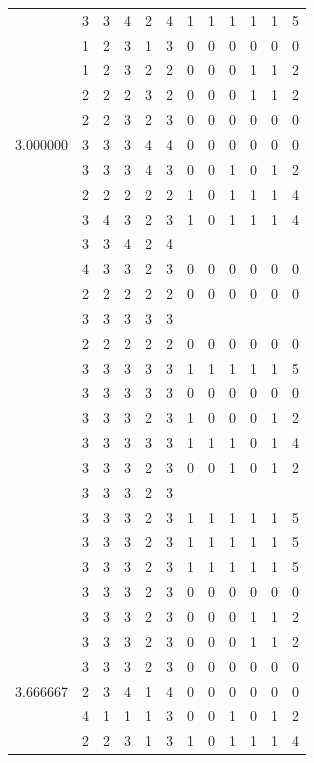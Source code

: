 \documentclass[]{book}
\theoremstyle{definition}
\theoremstyle{definition}
\theoremstyle{definition}
\theoremstyle{remark}
\begin{document}
\begin{table}
{\begin{tabular}[t]{rrrrrrrrrrrr}
 & 3 & 3 & 4 & 2 & 4 & 1 & 1 & 1 & 1 & 1 & 5\\
 & 1 & 2 & 3 & 1 & 3 & 0 & 0 & 0 & 0 & 0 & 0\\
 & 1 & 2 & 3 & 2 & 2 & 0 & 0 & 0 & 1 & 1 & 2\\
 & 2 & 2 & 2 & 3 & 2 & 0 & 0 & 0 & 1 & 1 & 2\\
 & 2 & 2 & 3 & 2 & 3 & 0 & 0 & 0 & 0 & 0 & 0\\
3.000000 & 3 & 3 & 3 & 4 & 4 & 0 & 0 & 0 & 0 & 0 & 0\\
 & 3 & 3 & 3 & 4 & 3 & 0 & 0 & 1 & 0 & 1 & 2\\
 & 2 & 2 & 2 & 2 & 2 & 1 & 0 & 1 & 1 & 1 & 4\\
 & 3 & 4 & 3 & 2 & 3 & 1 & 0 & 1 & 1 & 1 & 4\\
 & 3 & 3 & 4 & 2 & 4 &  &  &  &  &  & \\
 & 4 & 3 & 3 & 2 & 3 & 0 & 0 & 0 & 0 & 0 & 0\\
 & 2 & 2 & 2 & 2 & 2 & 0 & 0 & 0 & 0 & 0 & 0\\
 & 3 & 3 & 3 & 3 & 3 &  &  &  &  &  & \\
 & 2 & 2 & 2 & 2 & 2 & 0 & 0 & 0 & 0 & 0 & 0\\
 & 3 & 3 & 3 & 3 & 3 & 1 & 1 & 1 & 1 & 1 & 5\\
 & 3 & 3 & 3 & 3 & 3 & 0 & 0 & 0 & 0 & 0 & 0\\
 & 3 & 3 & 3 & 2 & 3 & 1 & 0 & 0 & 0 & 1 & 2\\
 & 3 & 3 & 3 & 3 & 3 & 1 & 1 & 1 & 0 & 1 & 4\\
 & 3 & 3 & 3 & 2 & 3 & 0 & 0 & 1 & 0 & 1 & 2\\
 & 3 & 3 & 3 & 2 & 3 &  &  &  &  &  & \\
 & 3 & 3 & 3 & 2 & 3 & 1 & 1 & 1 & 1 & 1 & 5\\
 & 3 & 3 & 3 & 2 & 3 & 1 & 1 & 1 & 1 & 1 & 5\\
 & 3 & 3 & 3 & 2 & 3 & 1 & 1 & 1 & 1 & 1 & 5\\
 & 3 & 3 & 3 & 2 & 3 & 0 & 0 & 0 & 0 & 0 & 0\\
 & 3 & 3 & 3 & 2 & 3 & 0 & 0 & 0 & 1 & 1 & 2\\
 & 3 & 3 & 3 & 2 & 3 & 0 & 0 & 0 & 1 & 1 & 2\\
 & 3 & 3 & 3 & 2 & 3 & 0 & 0 & 0 & 0 & 0 & 0\\
3.666667 & 2 & 3 & 4 & 1 & 4 & 0 & 0 & 0 & 0 & 0 & 0\\
 & 4 & 1 & 1 & 1 & 3 & 0 & 0 & 1 & 0 & 1 & 2\\
 & 2 & 2 & 3 & 1 & 3 & 1 & 0 & 1 & 1 & 1 & 4\\

\end{tabular}}
\end{table}
\end{document}
